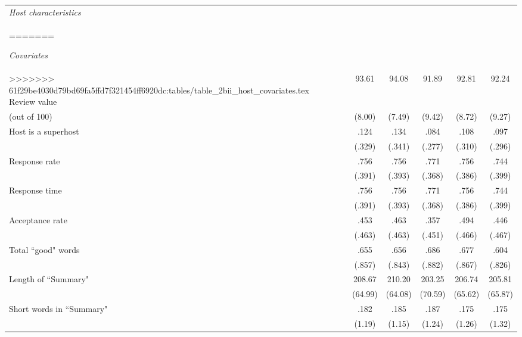 {\begin{longtable}{l*{6}{c}}
		\textit{Host characteristics} \\
=======
		
		\textit{Covariates} \\
>>>>>>> 61f29be4030d79bd69fa5ffd7f321454ff6920dc:tables/table_2bii_host_covariates.tex
		\hline
		Review value      &   &      93.61	&      94.08	 	&      91.89		&    92.81	 & 		92.24\\
		(out of 100)              &      &     (8.00)         &     (7.49)         &     (9.42)         &     (8.72) 	&	 (9.27)         \\
		[1em]
		Host is a superhost    &    &      .124		&      .134&      .084 &      .108  	& 	.097\\
		& & (.329)     &     (.341)         &     (.277)         &     (.310)         &     (.296)         \\
		[1em]
		Response rate      &   &       .756		&       .756		&      .771         &      .756  	& 	.744\\
		& &     (.391)         &     (.393)         &     (.368)         &     (.386)         &		(.399)\\
		[1em]
		Response time      &   &       .756		&       .756		&      .771         &      .756  	& 	.744\\
		& &     (.391)         &     (.393)         &     (.368)         &     (.386)         &		(.399)\\
		[1em]
		Acceptance rate      &     &      .453&      .463&       .357         &      .494    &	.446     \\
		& &     (.463)         &     (.463)         &     (.451)         &     (.466)         &		(.467)\\
		[1em]
		Total ``good" words       &    &      .655&      .656&       .686         &      .677    &	.604     \\
		& &     (.857)         &     (.843)         &     (.882)         &     (.867)         &		(.826)\\
		[1em]
		Length of ``Summary"      &     &      208.67 	&      210.20	&       203.25         &      206.74    &	205.81     \\
		& &       (64.99)  &    (64.08)         &     (70.59)         &     (65.62)         &     (65.87) \\
		[1em]
		Short words in ``Summary"          &  &      .182		&      .185		&       .187         &      .175    &	.175     \\
		& &     (1.19)         &     (1.15)         &     (1.24)         &     (1.26)         &		(1.32)\\                    

\end{longtable}}

